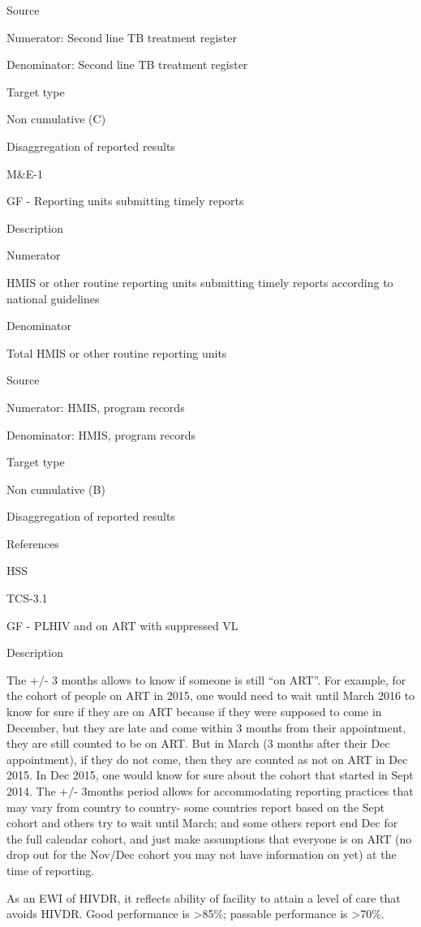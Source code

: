 \documentclass[]{book}
\begin{document}
Source

Numerator: Second line TB treatment register

Denominator: Second line TB treatment register

Target type

Non cumulative (C)

Disaggregation of reported results

M\&E-1

GF - Reporting units submitting timely reports

Description

Numerator

HMIS or other routine reporting units submitting timely reports according to national guidelines

Denominator

Total HMIS or other routine reporting units

Source

Numerator: HMIS, program records

Denominator: HMIS, program records

Target type

Non cumulative
(B)

Disaggregation of reported results

References

HSS

TCS-3.1

GF - PLHIV and on ART with suppressed VL

Description

The +/- 3 months allows to know if someone is still ``on ART''. For example, for the cohort of people on ART in 2015, one would need to wait until March 2016 to know for sure if they are on ART because if they were supposed to come in December, but they are late and come within 3 months from their appointment, they are still counted to be on ART. But in March (3 months after their Dec appointment), if they do not come, then they are counted as not on ART in Dec 2015. In Dec 2015, one would know for sure about the cohort that started in Sept 2014. The +/- 3months period allows for accommodating reporting practices that may vary from country to country- some countries report based on the Sept cohort and others try to wait until March; and some others report end Dec for the full calendar cohort, and just make assumptions that everyone is on ART (no drop out for the Nov/Dec cohort you may not have information on yet) at the time of reporting.

As an EWI of HIVDR, it reflects ability of facility to attain a level of care that avoids HIVDR. Good performance is \textgreater{}85\%; passable performance is \textgreater{}70\%.
\end{document}
